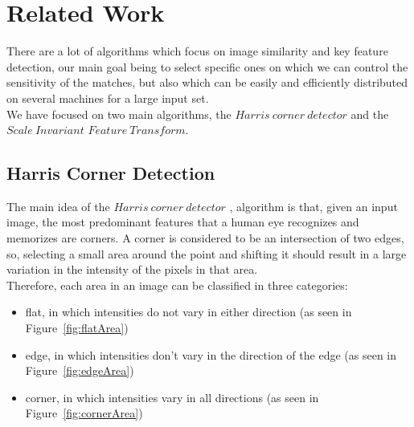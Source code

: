 \chapter{Related Work}
\label{chap:relatedWork}

There are a lot of algorithms which focus on image similarity and key feature detection, our main goal being to select specific ones on which we can control the sensitivity of the matches, but also which can be easily and efficiently distributed on several machines for a large input set. \\
We have focused on two main algorithms, the $Harris\ corner\ detector$ and the $Scale\ Invariant$ $Feature\ Transform$.


\section{Harris Corner Detection}

The main idea of the $Harris\ corner\ detector$ \cite{harrisCorner}, \cite{harrisCorner2} algorithm is that, given an input image, the most predominant features that a human eye recognizes and memorizes are corners. A corner is considered to be an intersection of two edges, so, selecting a small area around the point and shifting it should result in a large variation in the intensity of the pixels in that area. \\
Therefore, each area in an image can be classified in three categories:
\begin{itemize}
	\item flat, in which intensities do not vary in either direction (as seen in Figure~\ref{fig:flatArea})
	\item edge, in which intensities don't vary in the direction of the edge (as seen in Figure~\ref{fig:edgeArea})
	\item corner, in which intensities vary in all directions (as seen in Figure~\ref{fig:cornerArea})
\end{itemize}


